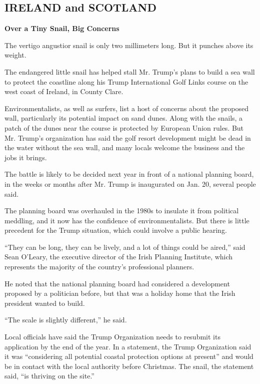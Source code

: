 \hypertarget{ireland-and-scotland}{%
\subsection{IRELAND and SCOTLAND}\label{ireland-and-scotland}}

\textbf{Over a Tiny Snail, Big Concerns}

The vertigo angustior snail is only two millimeters long. But it punches
above its weight.

The endangered little snail has helped stall Mr. Trump's plans to build
a sea wall to protect the coastline along his Trump International Golf
Links course on the west coast of Ireland, in County Clare.

Environmentalists, as well as surfers, list a host of concerns about the
proposed wall, particularly its potential impact on sand dunes. Along
with the snails, a patch of the dunes near the course is protected by
European Union rules. But Mr. Trump's organization has said the golf
resort development might be dead in the water without the sea wall, and
many locals welcome the business and the jobs it brings.

The battle is likely to be decided next year in front of a national
planning board, in the weeks or months after Mr. Trump is inaugurated on
Jan. 20, several people said.

The planning board was overhauled in the 1980s to insulate it from
political meddling, and it now has the confidence of environmentalists.
But there is little precedent for the Trump situation, which could
involve a public hearing.

``They can be long, they can be lively, and a lot of things could be
aired,'' said Sean O'Leary, the executive director of the Irish Planning
Institute, which represents the majority of the country's professional
planners.

He noted that the national planning board had considered a development
proposed by a politician before, but that was a holiday home that the
Irish president wanted to build.

``The scale is slightly different,'' he said.

Local officials have said the Trump Organization needs to resubmit its
application by the end of the year. In a statement, the Trump
Organization said it was ``considering all potential coastal protection
options at present'' and would be in contact with the local authority
before Christmas. The snail, the statement said, ``is thriving on the
site.''

